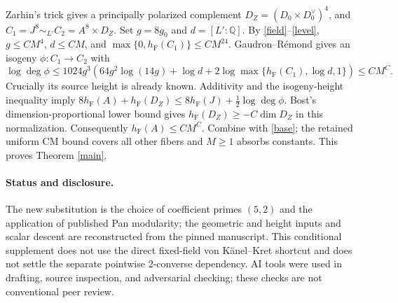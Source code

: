 \documentclass[11pt]{article}
\newcommand{\Q}{\mathbb Q}
\newcommand{\hF}{h_{\mathrm F}}
\begin{document}
Zarhin's trick \cite{Zarhin} gives a principally polarized complement
$D_Z=(D_0\times D_0^\vee)^4$, and
$C_1=J^8\sim_{L'} C_2=A^8\times D_Z$.
Set $g=8g_0$ and $d=[L':\Q]$. By \eqref{field}--\eqref{level},
$g\le CM^4$, $d\le CM$, and $\max\{0,\hF(C_1)\}\le CM^{24}$.
Gaudron--R\'emond \cite{GR} gives an isogeny $\phi:C_1\to C_2$ with
\[
 \log\deg\phi\le1024g^3\!
 \left(64g^2\log(14g)+\log d
       +2\log\max\{\hF(C_1),\log d,1\}\right)\le CM^{C}.
\]
Crucially its source height is already known. Additivity and the
isogeny-height inequality imply
$8\hF(A)+\hF(D_Z)\le8\hF(J)+\frac12\log\deg\phi$.
Bost's dimension-proportional lower bound \cite{Bost} gives
$\hF(D_Z)\ge-C\dim D_Z$ in this normalization.
Consequently $\hF(A)\le CM^C$.
Combine with \eqref{base}; the retained uniform CM bound covers all other
fibers and $M\ge1$ absorbs constants. This proves Theorem \ref{main}.

\paragraph{Status and disclosure.}
The new substitution is the choice of coefficient primes $(5,2)$ and the
application of published Pan modularity; the geometric and height inputs
and scalar descent are reconstructed from the pinned manuscript.
This conditional supplement does not use the direct fixed-field
von K\"anel--Kret shortcut and does not settle the separate pointwise
$2$-converse dependency. AI tools were used in drafting, source inspection,
and adversarial checking; these checks are not conventional peer review.
\end{document}
